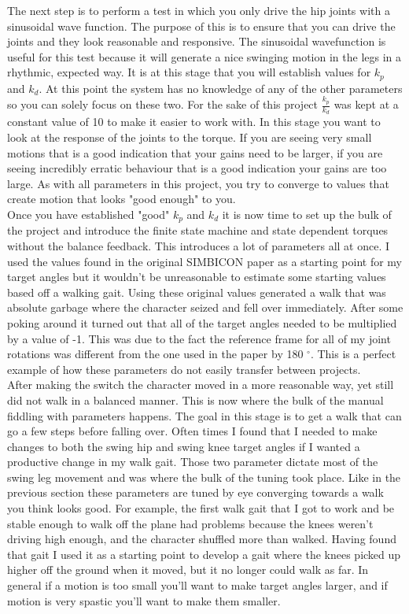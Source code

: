 \documentclass[12pt, a4paper]{article}
\begin{document}
The next step is to perform a test in which you only drive the hip joints with a sinusoidal wave function. The purpose of this is to ensure that you can drive the joints and they look reasonable and responsive. The sinusoidal wavefunction is useful for this test because it will generate a nice swinging motion in the legs in a rhythmic, expected way. It is at this stage that you will establish values for $k_p$ and $k_d$. At this point the system has no knowledge of any of the other parameters so you can solely focus on these two. For the sake of this project $\frac{k_p}{k_d}$ was kept at a constant value of 10 to make it easier to work with. In this stage you want to look at the response of the joints to the torque. If you are seeing very small motions that is a good indication that your gains need to be larger, if you are seeing incredibly erratic behaviour that is a good indication your gains are too large. As with all parameters in this project, you try to converge to values that create motion that looks "good enough" to you. \\

Once you have established "good" $k_p$ and $k_d$ it is now time to set up the bulk of the project and introduce the finite state machine and state dependent torques without the balance feedback. This introduces a lot of parameters all at once. I used the values found in the original SIMBICON paper \cite{Yin07} as a starting point for my target angles but it wouldn't be unreasonable to estimate some starting values based off a walking gait. Using these original values generated a walk that was absolute garbage where the character seized and fell over immediately. After some poking around it turned out that all of the target angles needed to be multiplied by a value of -1. This was due to the fact the reference frame for all of my joint rotations was different from the one used in the paper by 180 $^\circ$. This is a perfect example of how these parameters do not easily transfer between projects.\\ 

After making the switch the character moved in a more reasonable way, yet still did not walk in a balanced manner. This is now where the bulk of the manual fiddling with parameters happens. The goal in this stage is to get a walk that can go a few steps before falling over. Often times I found that I needed to make changes to both the swing hip and swing knee target angles if I wanted a productive change in my walk gait. Those two parameter dictate most of the swing leg movement and was where the bulk of the tuning took place. Like in the previous section these parameters are tuned by eye converging towards a walk you think looks good. For example, the first walk gait that I got to work and be stable enough to walk off the plane had problems because the knees weren't driving high enough, and the character shuffled more than walked. Having found that gait I used it as a starting point to develop a gait where the knees picked up higher off the ground when it moved, but it no longer could walk as far. In general if a motion is too small you'll want to make target angles larger, and if motion is very spastic you'll want to make them smaller.\\
\end{document}
